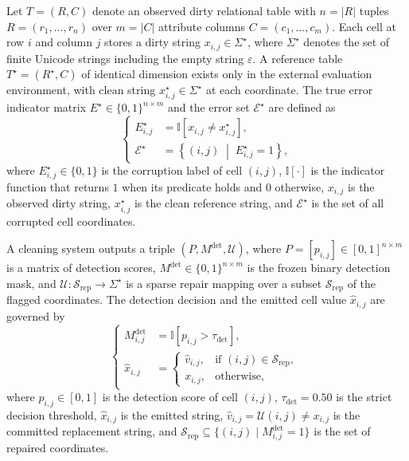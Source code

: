 \documentclass[conference]{IEEEtran}
\begin{document}
Let $T = (R, C)$ denote an observed dirty relational table with $n = |R|$ tuples $R = (r_1, \dots, r_n)$ over $m = |C|$ attribute columns $C = (c_1, \dots, c_m)$. Each cell at row $i$ and column $j$ stores a dirty string $x_{i,j} \in \Sigma^{\star}$, where $\Sigma^{\star}$ denotes the set of finite Unicode strings including the empty string $\varepsilon$. A reference table $T^{\star} = (R^{\star}, C)$ of identical dimension exists only in the external evaluation environment, with clean string $x_{i,j}^{\star} \in \Sigma^{\star}$ at each coordinate. The true error indicator matrix $E^{\star} \in \{0,1\}^{n \times m}$ and the error set $\mathcal{E}^{\star}$ are defined as
\begin{equation}
\label{eq:truth_def}
\left\{
\begin{aligned}
E_{i,j}^{\star} &= \mathbb{I}\!\left[x_{i,j} \neq x_{i,j}^{\star}\right], \\
\mathcal{E}^{\star} &= \left\{(i,j) \;\middle|\; E_{i,j}^{\star} = 1\right\},
\end{aligned}
\right.
\end{equation}
where $E_{i,j}^{\star} \in \{0,1\}$ is the corruption label of cell $(i,j)$, $\mathbb{I}[\cdot]$ is the indicator function that returns $1$ when its predicate holds and $0$ otherwise, $x_{i,j}$ is the observed dirty string, $x_{i,j}^{\star}$ is the clean reference string, and $\mathcal{E}^{\star}$ is the set of all corrupted cell coordinates.

A cleaning system outputs a triple $(P, M^{\mathrm{det}}, \mathcal{U})$, where $P = [p_{i,j}] \in [0,1]^{n \times m}$ is a matrix of detection scores, $M^{\mathrm{det}} \in \{0,1\}^{n \times m}$ is the frozen binary detection mask, and $\mathcal{U} : \mathcal{S}_{\mathrm{rep}} \to \Sigma^{\star}$ is a sparse repair mapping over a subset $\mathcal{S}_{\mathrm{rep}}$ of the flagged coordinates. The detection decision and the emitted cell value $\hat{x}_{i,j}$ are governed by
\begin{equation}
\label{eq:mask_repair_def}
\left\{
\begin{aligned}
M_{i,j}^{\mathrm{det}} &= \mathbb{I}\!\left[p_{i,j} > \tau_{\mathrm{det}}\right], \\
\hat{x}_{i,j} &=
\begin{cases}
\hat{v}_{i,j}, & \text{if } (i,j) \in \mathcal{S}_{\mathrm{rep}}, \\
x_{i,j}, & \text{otherwise},
\end{cases}
\end{aligned}
\right.
\end{equation}
where $p_{i,j} \in [0,1]$ is the detection score of cell $(i,j)$, $\tau_{\mathrm{det}} = 0.50$ is the strict decision threshold, $\hat{x}_{i,j}$ is the emitted string, $\hat{v}_{i,j} = \mathcal{U}(i,j) \neq x_{i,j}$ is the committed replacement string, and $\mathcal{S}_{\mathrm{rep}} \subseteq \{(i,j) \mid M_{i,j}^{\mathrm{det}} = 1\}$ is the set of repaired coordinates.
\end{document}
